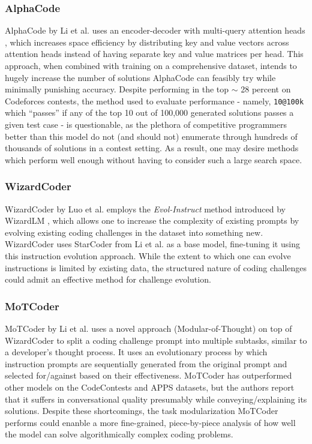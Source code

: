 \documentclass[10pt]{article}
\newcommand{\code}[1]{\texttt{#1}}
\theoremstyle{definition}
\begin{document}
\subsubsection{AlphaCode}
\noindent AlphaCode \cite{alphacode} by Li et al. uses an encoder-decoder with multi-query attention heads \cite{mqa}, which increases space efficiency by distributing key and value vectors across attention heads instead of having separate key and value matrices per head. This approach, when combined with training on a comprehensive dataset, intends to hugely increase the number of solutions AlphaCode can feasibly try while minimally punishing accuracy. Despite performing in the top $\sim$ 28 percent on Codeforces contests, the method used to evaluate performance - namely, \code{10@100k} which ``passes'' if any of the top 10 out of 100,000 generated solutions passes a given test case - is questionable, as the plethora of competitive programmers better than this model do not (and should not) enumerate through hundreds of thousands of solutions in a contest setting. As a result, one may desire methods which perform well enough without having to consider such a large search space.

\subsubsection{WizardCoder}
\noindent WizardCoder \cite{wizardcoder} by Luo et al. employs the \textit{Evol-Instruct} method introduced by WizardLM \cite{WizardLM}, which allows one to increase the complexity of existing prompts by evolving existing coding challenges in the dataset into something new. WizardCoder uses StarCoder from Li et al. \cite{starcoder} as a base model, fine-tuning it using this instruction evolution approach. While the extent to which one can evolve instructions is limited by existing data, the structured nature of coding challenges could admit an effective method for challenge evolution.

\subsubsection{MoTCoder}
\noindent MoTCoder \cite{motcoder} by Li et al. uses a novel approach (Modular-of-Thought) on top of WizardCoder \cite{wizardcoder} to split a coding challenge prompt into multiple subtasks, similar to a developer's thought process. It uses an evolutionary process by which instruction prompts are sequentially generated from the original prompt and selected for/against based on their effectiveness. MoTCoder has outperformed other models on the CodeContests and APPS datasets, but the authors report that it suffers in conversational quality presumably while conveying/explaining its solutions. Despite these shortcomings, the task modularization MoTCoder performs could enanble a more fine-grained, piece-by-piece analysis of how well the model can solve algorithmically complex coding problems.
\end{document}
